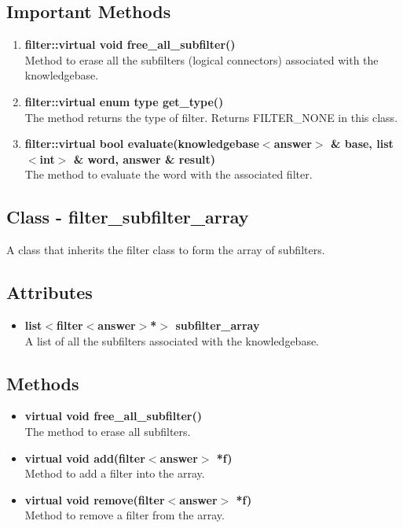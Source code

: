 \subsection*{Important Methods}
\begin{enumerate}
 \item \textbf{filter::virtual void free\_all\_subfilter()} \\
	Method to erase all the subfilters (logical connectors) associated with the knowledgebase.
 \item \textbf{filter::virtual enum type get\_type()} \\
	The method returns the type of filter. Returns FILTER\_NONE in this class.
 \item \textbf{filter::virtual bool evaluate(knowledgebase$<$answer$>$ \& base, list$<$int$>$ \& word, answer \& result)} \\
	The method to evaluate the word with the associated filter.
\end{enumerate}

\subsection{Class - filter\_subfilter\_array}
A class that inherits the filter class to form the array of subfilters.
\subsection*{Attributes}
\begin{itemize}
 \item \textbf{list$<$filter$<$answer$>$*$>$ subfilter\_array} \\
	A list of all the subfilters associated with the knowledgebase.
\end{itemize}
\subsection*{Methods}
\begin{itemize}
 \item \textbf{virtual void free\_all\_subfilter()} \\
	The method to erase all subfilters.
 \item \textbf{virtual void add(filter$<$answer$>$ *f)} \\
	Method to add a filter into the array.
 \item \textbf{virtual void remove(filter$<$answer$>$ *f)} \\
	Method to remove a filter from the array.
\end{itemize}

